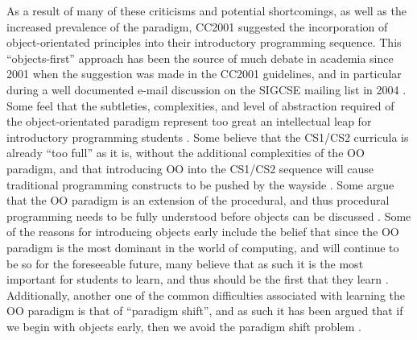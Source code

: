 As a result of many of these criticisms and potential shortcomings, as well as the increased prevalence of the paradigm, CC2001 suggested the incorporation of object-orientated principles into their introductory programming sequence.  This ``objects-first'' approach has been the source of much debate in academia since 2001 when the suggestion was made in the CC2001 guidelines, and in particular during a well documented e-mail discussion on the SIGCSE mailing list in 2004 \cite{Pausch03,Astrachan05,Hu04,Lister06}.  Some feel that the subtleties, complexities, and level of abstraction required of the object-orientated paradigm represent too great an intellectual leap for introductory programming students \cite{Hu04,Lister06}.  Some believe that the CS1/CS2 curricula is already ``too full'' as it is, without the additional complexities of the OO paradigm, and that introducing OO into the CS1/CS2 sequence will cause traditional programming constructs to be pushed by the wayside \cite{Hu04}.  Some argue that the OO paradigm is an extension of the procedural, and thus procedural programming needs to be fully understood before objects can be discussed \cite{Lister06}.  Some of the reasons for introducing objects early include the belief that since the OO paradigm is the most dominant in the world of computing, and will continue to be so for the foreseeable future, many believe that as such it is the most important for students to learn, and thus should be the first that they learn \cite{Pausch03}.  Additionally, another one of the common difficulties associated with learning the OO paradigm is that of ``paradigm shift'', and as such it has been argued that if we begin with objects early, then we avoid the paradigm shift problem \cite{Hu04,Lister06}.

